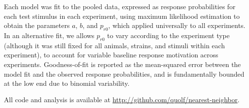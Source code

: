 Each model was fit to the pooled data, expressed as response probabilities for each test stimulus in each experiment, using maximum likelihood estimation to obtain the parameters $a$, $b$, and $p_{r0}$, which applied universally to all experiments.  In an alternative fit, we allows $p_{r0}$ to vary according to the experiment type (although it was still fixed for all animals, strains, and stimuli within each experiment), to account for variable baseline response motivation across experiments.  Goodness-of-fit is reported as the mean-squared error between the model fit and the observed response probabilities, and is fundamentally bounded at the low end due to binomial variability.  

All code and analysis is available at \url{http://github.com/quolf/nearest-neighbor}.  